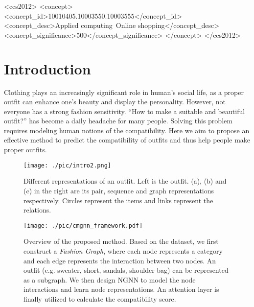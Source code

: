\documentclass[sigconf]{acmart}
\begin{document}
\begin{CCSXML}
<ccs2012>
<concept>
<concept_id>10010405.10003550.10003555</concept_id>
<concept_desc>Applied computing~Online shopping</concept_desc>
<concept_significance>500</concept_significance>
</concept>
</ccs2012>
\end{CCSXML}





\maketitle

\section{Introduction} \label{sect:intro}
Clothing plays an increasingly significant role in human's social life, as a proper outfit can enhance one's beauty and display the personality.
However, not everyone has a strong fashion sensitivity.
 ``How to make a suitable and beautiful outfit?'' has become a daily headache for many people.  Solving this problem requires modeling human notions of the compatibility. Here we aim to propose an effective method to predict the compatibility of outfits and thus help people make proper outfits.

\begin{figure}[t]
\centering
\texttt{[image: ./pic/intro2.png]}
\caption{
Different representations of an outfit. Left is the outfit. (a), (b) and (c) in the right are its pair, sequence and graph representations respectively. Circles represent the items and links represent the relations.}
\label{fig:intro}
\end{figure}

\begin{figure*}[t]
\centering
\texttt{[image: ./pic/cmgnn\_framework.pdf]}
\caption{
Overview of the proposed method. Based on the dataset, we first construct a \emph{Fashion Graph}, where each node represents a category and each edge represents the interaction between two nodes. An outfit (e.g. sweater, short, sandals, shoulder bag) can be represented as a subgraph. We then design NGNN to model the node interactions and learn node representations. An attention layer is finally utilized to calculate the compatibility score. }
\label{fig:framework}
\end{figure*}
\end{document}
